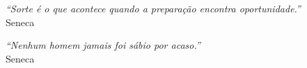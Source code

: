 


\begin{epigrafe}

\vspace*{\fill}\lang
{
}
{
    \begin{flushright}
        \textit{``Sorte é o que acontece quando a preparação encontra oportunidade.''} \\ Seneca
    \end{flushright}
    \begin{flushright}
        \textit{``Nenhum homem jamais foi sábio por acaso.''} \\ Seneca
    \end{flushright}
}

\end{epigrafe}


